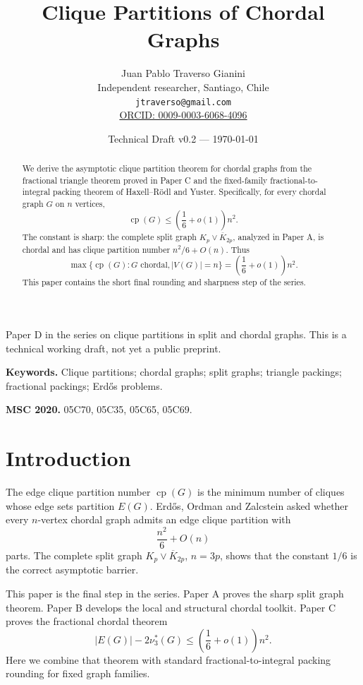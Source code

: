\documentclass[11pt]{article}
\title{Clique Partitions of Chordal Graphs}
\author{
Juan Pablo Traverso Gianini\\
Independent researcher, Santiago, Chile\\
\texttt{jtraverso@gmail.com}\\
\href{https://orcid.org/0009-0003-6068-4096}{ORCID: 0009-0003-6068-4096}
}
\date{Technical Draft v0.2 --- \today}
\theoremstyle{definition}
\newcommand{\cp}{\operatorname{cp}}
\begin{document}
\maketitle

\begin{center}
{\small Paper D in the series on clique partitions in split and chordal graphs. This is a technical working draft, not yet a public preprint.}
\end{center}

\noindent\textbf{Keywords.}
Clique partitions; chordal graphs; split graphs; triangle packings; fractional packings; Erdős problems.

\medskip

\noindent\textbf{MSC 2020.}
05C70, 05C35, 05C65, 05C69.

\begin{abstract}
We derive the asymptotic clique partition theorem for chordal graphs from the fractional triangle theorem proved in Paper C and the fixed-family fractional-to-integral packing theorem of Haxell--Rödl and Yuster. Specifically, for every chordal graph \(G\) on \(n\) vertices,
\[
    \cp(G)\le
    \left(\frac16+o(1)\right)n^2.
\]
The constant is sharp: the complete split graph \(K_p\vee\overline{K}_{2p}\), analyzed in Paper A, is chordal and has clique partition number \(n^2/6+O(n)\). Thus
\[
    \max\{\cp(G):G\text{ chordal}, |V(G)|=n\}
    =
    \left(\frac16+o(1)\right)n^2.
\]
This paper contains the short final rounding and sharpness step of the series.
\end{abstract}

\tableofcontents

\section{Introduction}

The edge clique partition number \(\cp(G)\) is the minimum number of cliques whose edge sets partition \(E(G)\). Erdős, Ordman and Zalcstein asked whether every \(n\)-vertex chordal graph admits an edge clique partition with
\[
    \frac{n^2}{6}+O(n)
\]
parts. The complete split graph \(K_p\vee\overline{K}_{2p}\), \(n=3p\), shows that the constant \(1/6\) is the correct asymptotic barrier.

This paper is the final step in the series. Paper A proves the sharp split graph theorem. Paper B develops the local and structural chordal toolkit. Paper C proves the fractional chordal theorem
\[
    |E(G)|-2\nu_3^*(G)
    \le
    \left(\frac16+o(1)\right)n^2.
\]
Here we combine that theorem with standard fractional-to-integral packing rounding for fixed graph families.
\end{document}
